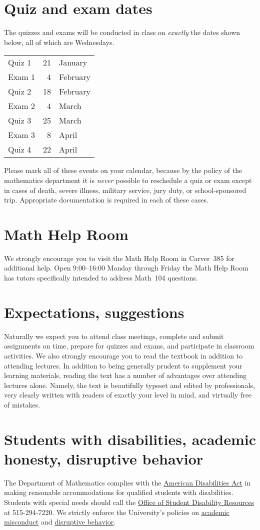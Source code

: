 \documentclass[11pt]{article}
\begin{document}
\section{Quiz and exam dates}
The quizzes and exams will be conducted in class
on {\em exactly} the dates shown below, all of which are Wednesdays.
\begin{center}\begin{tabular}{lrl}
Quiz 1&21&January\\
Exam 1&4&February\\
Quiz 2&18&February\\
Exam 2&4&March\\
Quiz 3&25&March\\
Exam 3&8&April\\
Quiz 4&22&April
\end{tabular}\end{center}
Please mark all of these events on your calendar,
because by the policy of the mathematics department
it is {\em never} possible to reschedule a quiz or exam
except in cases of death, severe illness, military service,
jury duty, or school-sponsored trip.
Appropriate documentation is required in each of these cases.

\section{Math Help Room}\label{MathCenter}
We strongly encourage you to visit the Math Help Room
in Carver~385 for additional help.
Open 9:00--16:00 Monday through Friday the Math Help Room
has tutors specifically intended to address Math~104 questions.

\section{Expectations, suggestions} Naturally we expect you to attend 
class meetings, complete and submit assignments on 
time, prepare for quizzes and exams, and participate in classroom 
activities. We also strongly encourage you to read the textbook
in addition to attending lectures.
In addition to being generally prudent to 
supplement your learning materials, reading the text has a number of 
advantages over attending lectures alone. Namely, the text is beautifully 
typeset and edited by professionals, very clearly written with readers 
of exactly your level in mind, and virtually free of mistakes.
\section{Students with disabilities, academic honesty, disruptive behavior}
The Department of Mathematics complies with the 
\href{http://www.ada.gov}{American Disabilities Act} in making reasonable 
accommodations for qualified students with disabilities.  Students with 
special needs should call the 
\href{http://www.dso.iastate.edu/dr}{Office of Student Disability Resources} at
515-294-7220.
We strictly enforce the University's policies on 
\href{http://www.dso.iastate.edu/ja/academic/misconduct}{academic misconduct}
and \href{http://www.dso.iastate.edu/sa/issuesconcerns/disruption}
{disruptive behavior}.
\end{document}
